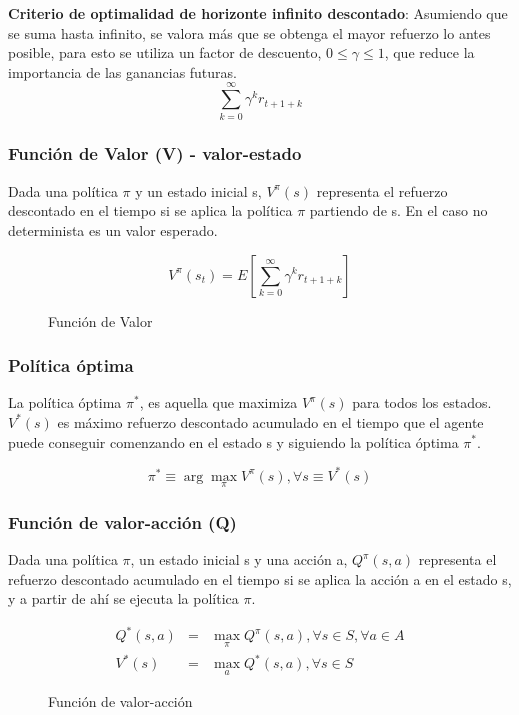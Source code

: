 \documentclass[12pt, twoside, openright]{report} %
\begin{document}
\textbf{Criterio de optimalidad de horizonte infinito descontado}: Asumiendo que se suma hasta infinito, se valora más que se obtenga el mayor refuerzo lo antes posible, para esto se utiliza un factor de descuento, $0 \leq \gamma \leq 1$, que reduce la importancia de las ganancias futuras.
$$\sum ^\infty _{k=0} \gamma^k r_{t+1+k}$$

\pagebreak

\subsubsection{Función de Valor (V) - valor-estado}
Dada una política $\pi$ y un estado inicial s, $V^\pi (s)$ representa el refuerzo descontado en el tiempo si se aplica la política $\pi$ partiendo de s. En el caso no determinista es un valor esperado.

\begin{figure}[H]
	$$V^\pi(s_t)=E \left[ \sum ^\infty _{k=0} \gamma^k r_{t+1+k} \right]$$
	\captionsetup{justification=centering}
	\caption{Función de Valor}
\end{figure}

\subsubsection{Política óptima}
La política óptima $\pi^*$, es aquella que maximiza $V^\pi (s)$ para todos los estados. $V^* (s)$ es máximo refuerzo descontado acumulado en el tiempo que el agente puede conseguir comenzando en el estado s y siguiendo la política óptima $\pi^*$.

$$\pi ^* \equiv \arg \max_\pi V^\pi (s), \forall s \equiv V^* (s)$$


\subsubsection{Función de valor-acción (Q)}
Dada una política $\pi$, un estado inicial s y una acción a, $Q^\pi (s, a)$ representa el refuerzo descontado acumulado en el tiempo si se aplica la acción a en el estado s, y a partir de ahí se ejecuta la política $\pi$.

\begin{figure}[H]
	\begin{eqnarray*}
		Q^* (s, a) &=& \max_\pi Q^\pi (s, a), \forall s \in S, \forall a \in A \\
		V^* (s) &=& \max_a Q^* (s, a), \forall s \in S
	\end{eqnarray*}
	\captionsetup{justification=centering}
	\caption{Función de valor-acción}
\end{figure}
\end{document}
